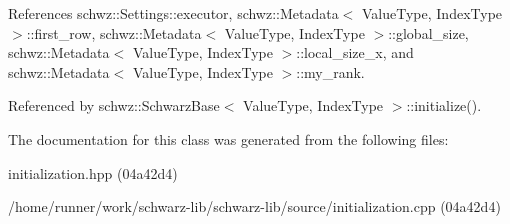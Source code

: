 References schwz\+::\+Settings\+::executor, schwz\+::\+Metadata$<$ Value\+Type, Index\+Type $>$\+::first\+\_\+row, schwz\+::\+Metadata$<$ Value\+Type, Index\+Type $>$\+::global\+\_\+size, schwz\+::\+Metadata$<$ Value\+Type, Index\+Type $>$\+::local\+\_\+size\+\_\+x, and schwz\+::\+Metadata$<$ Value\+Type, Index\+Type $>$\+::my\+\_\+rank.



Referenced by schwz\+::\+Schwarz\+Base$<$ Value\+Type, Index\+Type $>$\+::initialize().



The documentation for this class was generated from the following files\+:\begin{DoxyCompactItemize}
\item 
initialization.\+hpp (04a42d4)\item 
/home/runner/work/schwarz-\/lib/schwarz-\/lib/source/initialization.\+cpp (04a42d4)\end{DoxyCompactItemize}
